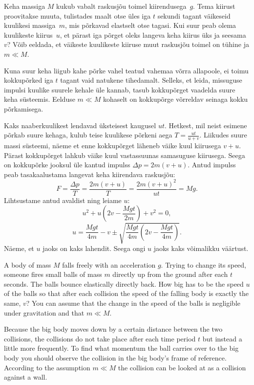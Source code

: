 
Keha massiga $M$ kukub vabalt raskusjõu toimel kiirendusega~$g$. Tema
kiirust proovitakse muuta, tulistades maalt otse üles iga $t$ sekundi tagant
väikeseid kuulikesi massiga~$m$, mis põrkavad elastselt otse tagasi.
Kui suur peab olema kuulikeste kiirus~$u$, et pärast iga põrget oleks langeva
keha kiirus üks ja seesama~$v$? Võib eeldada, et väikeste kuulikeste kiiruse muut raskusjõu toimel on
tühine ja $m\ll M$.

\hint
Kuna suur keha liigub kahe põrke vahel teatud vahemaa võrra allapoole, ei toimu kokkupõrked iga $t$ tagant vaid natukene tihedamalt. Selleks, et leida, missuguse impulsi kuulike suurele kehale üle kannab, tasub kokkupõrget vaadelda suure keha süsteemis. Eelduse $m\ll M$ kohaselt on kokkupõrge võrreldav seinaga kokku põrkamisega.

\solu
Kaks naaberkuulikest lendavad üksteisest kaugusel $u t$. Hetkest, mil neist esimene põrkab suure kehaga, kulub teise kuulikese põrkeni aega $T=\frac{u t}{u+v}$.
Liikudes suure massi süsteemi, näeme et enne kokkupõrget läheneb väike kuul kiirusega $v + u$. Pärast kokkupõrget lahkub väike kuul vastassuunas samasuguse kiirusega. Seega on kokkupõrke jooksul üle kantud impulss $\Delta p = 2m(v + u)$. Antud impulss peab tasakaalustama langevat keha kiirendava raskusjõu: \[ F=\frac{\Delta p}{T}=\frac{2m(v + u)}{T} = \frac{2m(v + u)^2}{ut}=Mg. \]
Lihtsustame antud avaldist ning leiame $u$:
\[
u^2 + u\left( 2v - \frac{Mgt}{2m}\right) + v^2 = 0,
\]
\[
u = \frac{Mgt}{4m} - v \pm \sqrt{\frac{Mgt}{4m}\left( 2v - \frac{Mgt}{4m}\right)}.
\]
Näeme, et $u$ jaoks on kaks lahendit. Seega ongi $u$ jaoks kaks võimalikku väärtust.

A body of mass $M$ falls freely with an acceleration $g$. Trying to change its speed, someone fires small balls of mass $m$ directly up from the ground after each $t$ seconds. The balls bounce elastically directly back. How big has to be the speed $u$ of the balls so that after each collision the speed of the falling body is exactly the same, $v$? You can assume that the change in the speed of the balls is negligible under gravitation and that $m\ll M$.

\hinteng
Because the big body moves down by a certain distance between the two collisions, the collisions do not take place after each time period $t$ but instead a little more frequently. To find what momentum the ball carries over to the big body you should observe the collision in the big body’s frame of reference. According to the assumption $m\ll M$ the collision can be looked at as a collision against a wall.

